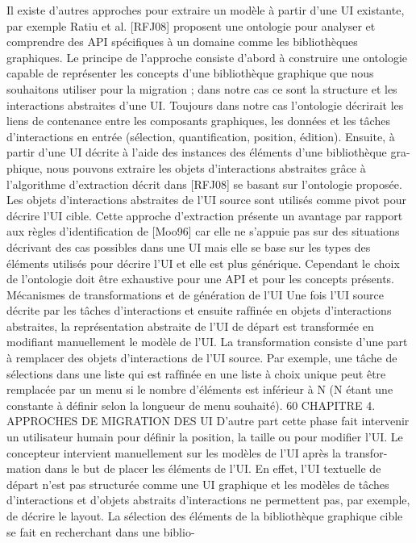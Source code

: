 \documentclass{article}
\begin{document}
Il existe d’autres approches pour extraire un modèle à partir d’une UI existante, par exemple
Ratiu et al. [RFJ08] proposent une ontologie pour analyser et comprendre des API spéciﬁques à un
domaine comme les bibliothèques graphiques. Le principe de l’approche consiste d’abord à construire
une ontologie capable de représenter les concepts d’une bibliothèque graphique que nous souhaitons
utiliser pour la migration ; dans notre cas ce sont la structure et les interactions abstraites d’une UI.
Toujours dans notre cas l’ontologie décrirait les liens de contenance entre les composants graphiques,
les données et les tâches d’interactions en entrée (sélection, quantiﬁcation, position, édition).
Ensuite, à partir d’une UI décrite à l’aide des instances des éléments d’une bibliothèque gra-
phique, nous pouvons extraire les objets d’interactions abstraites grâce à l’algorithme d’extraction
décrit dans [RFJ08] se basant sur l’ontologie proposée. Les objets d’interactions abstraites de l’UI
source sont utilisés comme pivot pour décrire l’UI cible.
Cette approche d’extraction présente un avantage par rapport aux règles d’identiﬁcation de
[Moo96] car elle ne s’appuie pas sur des situations décrivant des cas possibles dans une UI mais
elle se base sur les types des éléments utilisés pour décrire l’UI et elle est plus générique. Cependant
le choix de l’ontologie doit être exhaustive pour une API et pour les concepts présents.
Mécanismes de transformations et de génération de l’UI
Une fois l’UI source décrite par les
tâches d’interactions et ensuite rafﬁnée en objets d’interactions abstraites, la représentation abstraite
de l’UI de départ est transformée en modiﬁant manuellement le modèle de l’UI.
La transformation consiste d’une part à remplacer des objets d’interactions de l’UI source. Par
exemple, une tâche de sélections dans une liste qui est rafﬁnée en une liste à choix unique peut être
remplacée par un menu si le nombre d’éléments est inférieur à N (N étant une constante à déﬁnir selon
la longueur de menu souhaité).
60
CHAPITRE 4. APPROCHES DE MIGRATION DES UI
D’autre part cette phase fait intervenir un utilisateur humain pour déﬁnir la position, la taille ou
pour modiﬁer l’UI. Le concepteur intervient manuellement sur les modèles de l’UI après la transfor-
mation dans le but de placer les éléments de l’UI. En effet, l’UI textuelle de départ n’est pas structurée
comme une UI graphique et les modèles de tâches d’interactions et d’objets abstraits d’interactions ne
permettent pas, par exemple, de décrire le layout.
La sélection des éléments de la bibliothèque graphique cible se fait en recherchant dans une biblio-
\end{document}
